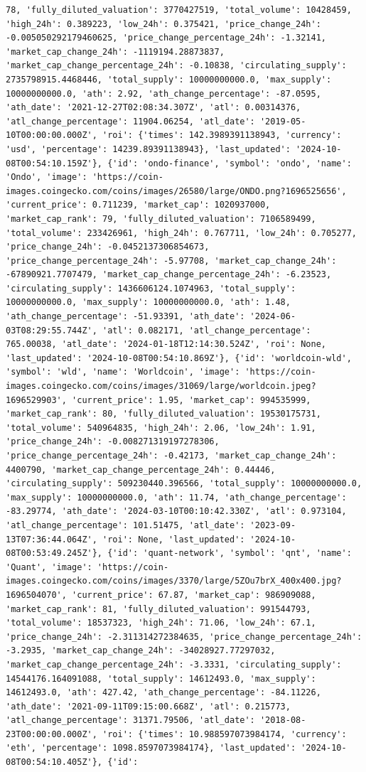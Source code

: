 \documentclass[
  letterpaper,
  DIV=11,
  numbers=noendperiod]{scrreprt}
\begin{document}
\begin{verbatim}
78, 'fully_diluted_valuation': 3770427519, 'total_volume': 10428459, 'high_24h': 0.389223, 'low_24h': 0.375421, 'price_change_24h': -0.005050292179460625, 'price_change_percentage_24h': -1.32141, 'market_cap_change_24h': -1119194.28873837, 'market_cap_change_percentage_24h': -0.10838, 'circulating_supply': 2735798915.4468446, 'total_supply': 10000000000.0, 'max_supply': 10000000000.0, 'ath': 2.92, 'ath_change_percentage': -87.0595, 'ath_date': '2021-12-27T02:08:34.307Z', 'atl': 0.00314376, 'atl_change_percentage': 11904.06254, 'atl_date': '2019-05-10T00:00:00.000Z', 'roi': {'times': 142.3989391138943, 'currency': 'usd', 'percentage': 14239.89391138943}, 'last_updated': '2024-10-08T00:54:10.159Z'}, {'id': 'ondo-finance', 'symbol': 'ondo', 'name': 'Ondo', 'image': 'https://coin-images.coingecko.com/coins/images/26580/large/ONDO.png?1696525656', 'current_price': 0.711239, 'market_cap': 1020937000, 'market_cap_rank': 79, 'fully_diluted_valuation': 7106589499, 'total_volume': 233426961, 'high_24h': 0.767711, 'low_24h': 0.705277, 'price_change_24h': -0.0452137306854673, 'price_change_percentage_24h': -5.97708, 'market_cap_change_24h': -67890921.7707479, 'market_cap_change_percentage_24h': -6.23523, 'circulating_supply': 1436606124.1074963, 'total_supply': 10000000000.0, 'max_supply': 10000000000.0, 'ath': 1.48, 'ath_change_percentage': -51.93391, 'ath_date': '2024-06-03T08:29:55.744Z', 'atl': 0.082171, 'atl_change_percentage': 765.00038, 'atl_date': '2024-01-18T12:14:30.524Z', 'roi': None, 'last_updated': '2024-10-08T00:54:10.869Z'}, {'id': 'worldcoin-wld', 'symbol': 'wld', 'name': 'Worldcoin', 'image': 'https://coin-images.coingecko.com/coins/images/31069/large/worldcoin.jpeg?1696529903', 'current_price': 1.95, 'market_cap': 994535999, 'market_cap_rank': 80, 'fully_diluted_valuation': 19530175731, 'total_volume': 540964835, 'high_24h': 2.06, 'low_24h': 1.91, 'price_change_24h': -0.008271319197278306, 'price_change_percentage_24h': -0.42173, 'market_cap_change_24h': 4400790, 'market_cap_change_percentage_24h': 0.44446, 'circulating_supply': 509230440.396566, 'total_supply': 10000000000.0, 'max_supply': 10000000000.0, 'ath': 11.74, 'ath_change_percentage': -83.29774, 'ath_date': '2024-03-10T00:10:42.330Z', 'atl': 0.973104, 'atl_change_percentage': 101.51475, 'atl_date': '2023-09-13T07:36:44.064Z', 'roi': None, 'last_updated': '2024-10-08T00:53:49.245Z'}, {'id': 'quant-network', 'symbol': 'qnt', 'name': 'Quant', 'image': 'https://coin-images.coingecko.com/coins/images/3370/large/5ZOu7brX_400x400.jpg?1696504070', 'current_price': 67.87, 'market_cap': 986909088, 'market_cap_rank': 81, 'fully_diluted_valuation': 991544793, 'total_volume': 18537323, 'high_24h': 71.06, 'low_24h': 67.1, 'price_change_24h': -2.311314272384635, 'price_change_percentage_24h': -3.2935, 'market_cap_change_24h': -34028927.77297032, 'market_cap_change_percentage_24h': -3.3331, 'circulating_supply': 14544176.164091088, 'total_supply': 14612493.0, 'max_supply': 14612493.0, 'ath': 427.42, 'ath_change_percentage': -84.11226, 'ath_date': '2021-09-11T09:15:00.668Z', 'atl': 0.215773, 'atl_change_percentage': 31371.79506, 'atl_date': '2018-08-23T00:00:00.000Z', 'roi': {'times': 10.988597073984174, 'currency': 'eth', 'percentage': 1098.8597073984174}, 'last_updated': '2024-10-08T00:54:10.405Z'}, {'id': 
\end{verbatim}
\end{document}

